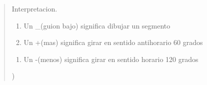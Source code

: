 \begin{boxedminipage}{\funcwidth}
\begin{quote}
{\begin{itemize}
      \end{itemize}

      Interpretacion.

      \begin{enumerate}

      \setlength{\parskip}{0.5ex}
        \item Un \_(guion bajo) significa dibujar un segmento

        \item Un +(mas) significa girar en sentido antihorario 60 grados

      \end{enumerate}

      \begin{enumerate}

      \setlength{\parskip}{0.5ex}
        \item Un -(menos) significa girar en sentido horario 120 grados

      \end{enumerate})}

      \end{quote}

    \end{boxedminipage}

    \label{FractalZE:koch:Koch:segmentLength}

    \vspace{0.5ex}

